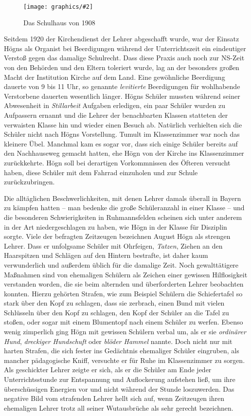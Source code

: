 \documentclass{book}
\newcommand{\img}[2][width=\linewidth]{\noindent\texttt{[image: graphics/\#2]}}
\begin{document}
\begin{figure}
\img{Schulhaus-1908}
\caption{Das Schulhaus von 1908}
\end{figure}

Seitdem 1920 der Kirchendienst der Lehrer abgeschafft wurde, war der
Einsatz Högns als Organist bei Beerdigungen während der Unterrichtszeit
ein eindeutiger Verstoß gegen das damalige Schulrecht. Dass diese
Praxis auch noch zur NS-Zeit von den Behörden und den Eltern toleriert
wurde, lag an der besonders großen Macht der Institution Kirche auf dem
Land. Eine gewöhnliche Beerdigung dauerte von 9 bis 11 Uhr, so
genannte \textit{levitierte} Beerdigungen für wohlhabende Verstorbene
dauerten wesentlich länger. Högns Schüler mussten während seiner
Abwesenheit in \textit{Stillarbeit} Aufgaben erledigen, ein paar
Schüler wurden zu Aufpassern ernannt und die Lehrer der benachbarten
Klassen statteten der verwaisten Klasse hin und wieder einen Besuch
ab. Natürlich verhielten sich die Schüler nicht nach Högns Vorstellung.
Tumult im Klassenzimmer war noch das kleinere Übel. Manchmal kam es
sogar vor, dass sich einige Schüler bereits auf den Nachhauseweg
gemacht hatten, ehe Högn von der Kirche ins Klassenzimmer zurückkehrte.
Högn soll bei derartigen Vorkommnissen des Öfteren versucht haben,
diese Schüler mit dem Fahrrad einzuholen und zur Schule
zurückzubringen.

Die alltäglichen Beschwerlichkeiten, mit denen Lehrer damals überall in
Bayern zu kämpfen hatten – man bedenke die große Schüleranzahl in einer
Klasse – und die besonderen Schwierigkeiten in Ruhmannsfelden scheinen
sich unter anderem in der Art niedergeschlagen zu haben, wie Högn in
der Klasse für Disziplin sorgte. Viele der befragten Zeitzeugen
bezeichnen August Högn als strengen Lehrer. Dass er unfolgsame Schüler
mit Ohrfeigen, \textit{Tatzen}, Ziehen an den Haarspitzen und Schlägen
auf den Hintern bestrafte, ist daher kaum verwunderlich und außerdem
üblich für die damalige Zeit. Noch gewalttätigere Maßnahmen sind von
ehemaligen Schülern als Zeichen einer gewissen Hilflosigkeit verstanden
worden, die sie beim alternden und überforderten Lehrer beobachten
konnten. Hierzu gehörten Strafen, wie zum Beispiel Schülern die
Schiefertafel so stark über den Kopf zu schlagen, dass sie zerbrach,
einen Bund mit vielen Schlüsseln über den Kopf zu schlagen, den Kopf
der Schüler an die Tafel zu stoßen, oder sogar mit einem Blumentopf
nach einem Schüler zu werfen. Ebenso wenig zimperlich ging Högn mit
gewissen Schülern verbal um, als er sie \textit{ordinärer Hund},
\textit{dreckiger Hundschuft} oder \textit{blöder Hammel} nannte. Doch
nicht nur mit harten Strafen, die sich fester ins Gedächtnis ehemaliger
Schüler eingruben, als mancher pädagogische Kniff, versuchte er für
Ruhe im Klassenzimmer zu sorgen. Als geschickter Lehrer zeigte er sich,
als er die Schüler am Ende jeder Unterrichtsstunde zur Entspannung und
Auflockerung aufstehen ließ, um ihre überschüssigen Energien vor und
nicht während der Stunde loszuwerden. Das negative Bild vom strafenden
Lehrer hellt sich auf, wenn Zeitzeugen ihren ehemaligen Lehrer trotz
all seiner Wutausbrüche als sehr gerecht bezeichnen.
\end{document}
